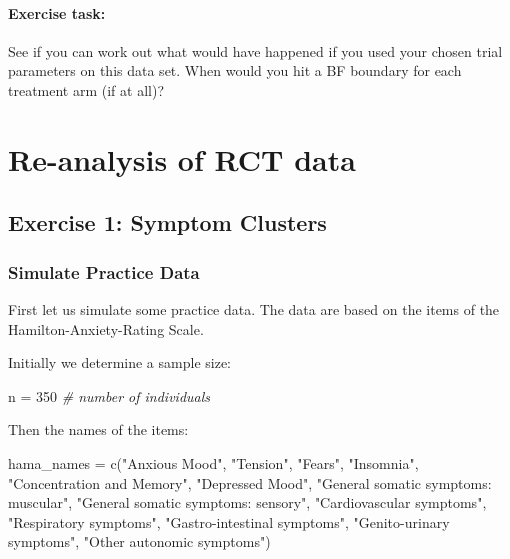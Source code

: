 \documentclass[
]{book}
\newenvironment{Shaded}{\begin{snugshade}}{\end{snugshade}}
\newcommand{\CommentTok}[1]{\textcolor[rgb]{0.56,0.35,0.01}{\textit{#1}}}
\newcommand{\DecValTok}[1]{\textcolor[rgb]{0.00,0.00,0.81}{#1}}
\newcommand{\FunctionTok}[1]{\textcolor[rgb]{0.00,0.00,0.00}{#1}}
\newcommand{\NormalTok}[1]{#1}
\newcommand{\OtherTok}[1]{\textcolor[rgb]{0.56,0.35,0.01}{#1}}
\newcommand{\StringTok}[1]{\textcolor[rgb]{0.31,0.60,0.02}{#1}}
\begin{document}
\hypertarget{exercise-task}{%
\subsubsection{Exercise task:}\label{exercise-task}}

See if you can work out what would have happened if you used your chosen trial parameters on this data set. When would you hit a BF boundary for each treatment arm (if at all)?

\hypertarget{re-analysis-of-rct-data}{%
\chapter{Re-analysis of RCT data}\label{re-analysis-of-rct-data}}

\hypertarget{exercise-1-symptom-clusters}{%
\section{Exercise 1: Symptom Clusters}\label{exercise-1-symptom-clusters}}

\hypertarget{simulate-practice-data}{%
\subsection{Simulate Practice Data}\label{simulate-practice-data}}

First let us simulate some practice data. The data are based on the items of the Hamilton-Anxiety-Rating Scale.

Initially we determine a sample size:

\begin{Shaded}
\begin{Highlighting}[]
\NormalTok{n }\OtherTok{=} \DecValTok{350} \CommentTok{\# number of individuals}
\end{Highlighting}
\end{Shaded}

Then the names of the items:

\begin{Shaded}
\begin{Highlighting}[]
\NormalTok{hama\_names }\OtherTok{=} \FunctionTok{c}\NormalTok{(}\StringTok{"Anxious Mood"}\NormalTok{,}
               \StringTok{"Tension"}\NormalTok{,}
               \StringTok{"Fears"}\NormalTok{,}
               \StringTok{"Insomnia"}\NormalTok{,}
               \StringTok{"Concentration and Memory"}\NormalTok{,}
               \StringTok{"Depressed Mood"}\NormalTok{,}
               \StringTok{"General somatic symptoms: muscular"}\NormalTok{,}
               \StringTok{"General somatic symptoms: sensory"}\NormalTok{,}
               \StringTok{"Cardiovascular symptoms"}\NormalTok{,}
               \StringTok{"Respiratory symptoms"}\NormalTok{,}
               \StringTok{"Gastro{-}intestinal symptoms"}\NormalTok{,}
               \StringTok{"Genito{-}urinary symptoms"}\NormalTok{,}
               \StringTok{"Other autonomic symptoms"}\NormalTok{)}
\end{Highlighting}
\end{Shaded}
\end{document}
